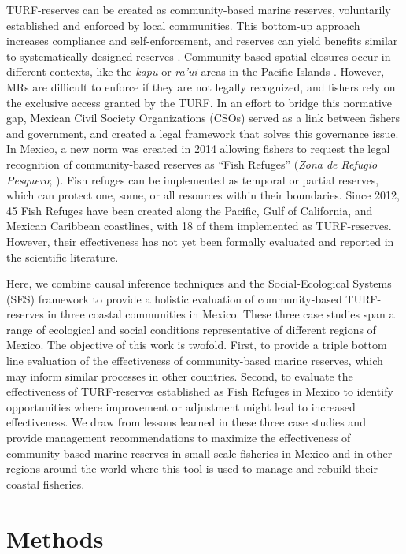 \documentclass{frontiersSCNS}
\begin{document}
TURF-reserves can be created as community-based marine reserves,
voluntarily established and enforced by local communities. This
bottom-up approach increases compliance and self-enforcement, and
reserves can yield benefits similar to systematically-designed reserves
\citep{gelcich_2015-Gw,espinosaromero_2014-PY,beger_2004-Y8,smallhornwest_2018}.
Community-based spatial closures occur in different contexts, like the
\emph{kapu} or \emph{ra'ui} areas in the Pacific Islands
\citep{bohnsack_2004,johannes_2002}. However, MRs are difficult to
enforce if they are not legally recognized, and fishers rely on the
exclusive access granted by the TURF. In an effort to bridge this
normative gap, Mexican Civil Society Organizations (CSOs) served as a
link between fishers and government, and created a legal framework that
solves this governance issue. In Mexico, a new norm was created in 2014
allowing fishers to request the legal recognition of community-based
reserves as ``Fish Refuges'' (\emph{Zona de Refugio Pesquero};
\citet{nom}). Fish refuges can be implemented as temporal or partial
reserves, which can protect one, some, or all resources within their
boundaries. Since 2012, 45 Fish Refuges have been created along the
Pacific, Gulf of California, and Mexican Caribbean coastlines, with 18
of them implemented as TURF-reserves. However, their effectiveness has
not yet been formally evaluated and reported in the scientific
literature.

Here, we combine causal inference techniques and the Social-Ecological
Systems (SES) framework to provide a holistic evaluation of
community-based TURF-reserves in three coastal communities in Mexico.
These three case studies span a range of ecological and social
conditions representative of different regions of Mexico. The objective
of this work is twofold. First, to provide a triple bottom line
evaluation of the effectiveness of community-based marine reserves,
which may inform similar processes in other countries. Second, to
evaluate the effectiveness of TURF-reserves established as Fish Refuges
in Mexico to identify opportunities where improvement or adjustment
might lead to increased effectiveness. We draw from lessons learned in
these three case studies and provide management recommendations to
maximize the effectiveness of community-based marine reserves in
small-scale fisheries in Mexico and in other regions around the world
where this tool is used to manage and rebuild their coastal fisheries.

\section{Methods}\label{methods}
\end{document}
